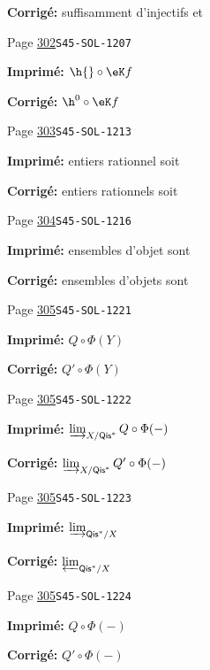 \begin{description}
\par\noindent\textbf{Corrigé:} suffisamment d'injectifs et
\smallskip
\item[\hypertarget{apparatus:FR-0302}{302}] Page \hyperlink{printpage:fr:302}{302}\quad\texttt{S45-SOL-1207}
\par\noindent\textbf{Imprimé:} \(\h{}\circ \eK f\)
\par\noindent\textbf{Corrigé:} \(\h^0{}\circ \eK f\)
\smallskip
\item[\hypertarget{apparatus:FR-0303}{303}] Page \hyperlink{printpage:fr:303}{303}\quad\texttt{S45-SOL-1213}
\par\noindent\textbf{Imprimé:} entiers rationnel soit
\par\noindent\textbf{Corrigé:} entiers rationnels soit
\smallskip
\item[\hypertarget{apparatus:FR-0304}{304}] Page \hyperlink{printpage:fr:304}{304}\quad\texttt{S45-SOL-1216}
\par\noindent\textbf{Imprimé:} ensembles d'objet sont
\par\noindent\textbf{Corrigé:} ensembles d'objets sont
\smallskip
\item[\hypertarget{apparatus:FR-0305}{305}] Page \hyperlink{printpage:fr:305}{305}\quad\texttt{S45-SOL-1221}
\par\noindent\textbf{Imprimé:} $Q\circ \Phi(Y)$
\par\noindent\textbf{Corrigé:} $Q'\circ \Phi(Y)$
\smallskip
\item[\hypertarget{apparatus:FR-0306}{306}] Page \hyperlink{printpage:fr:305}{305}\quad\texttt{S45-SOL-1222}
\par\noindent\textbf{Imprimé:} \(\varinjlim_{X/\mathsf{Qis}^\ast} Q\circ\Phi(-)\)
\par\noindent\textbf{Corrigé:} \(\varinjlim_{X/\mathsf{Qis}^\ast} Q'\circ\Phi(-)\)
\smallskip
\item[\hypertarget{apparatus:FR-0307}{307}] Page \hyperlink{printpage:fr:305}{305}\quad\texttt{S45-SOL-1223}
\par\noindent\textbf{Imprimé:} \(\varinjlim_{\mathsf{Qis}^\ast/X}\)
\par\noindent\textbf{Corrigé:} \(\varprojlim_{\mathsf{Qis}^\ast/X}\)
\smallskip
\item[\hypertarget{apparatus:FR-0308}{308}] Page \hyperlink{printpage:fr:305}{305}\quad\texttt{S45-SOL-1224}
\par\noindent\textbf{Imprimé:} \(Q\circ \Phi(-)\)
\par\noindent\textbf{Corrigé:} \(Q'\circ \Phi(-)\)

\end{description}
